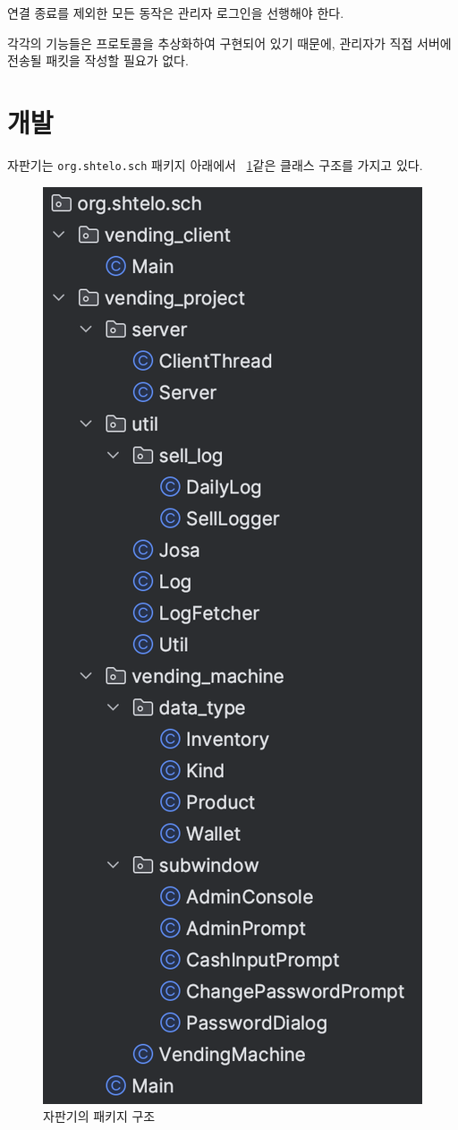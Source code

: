 \documentclass{oblivoir}
\newcommand{\figref}[1]{\figurename~\ref{#1}}
\begin{document}
    연결 종료를 제외한 모든 동작은 관리자 로그인을 선행해야 한다.

    각각의 기능들은 프로토콜을 추상화하여 구현되어 있기 때문에,
    관리자가 직접 서버에 전송될 패킷을 작성할 필요가 없다.

    \section{개발}

    자판기는 \texttt{org.shtelo.sch} 패키지 아래에서 \figref{fig:uml}\과 같은 클래스 구조를 가지고 있다.

    \begin{figure}[h]
        \centering
        \includegraphics[height=0.5\textheight]{images/class-tree}
        \caption{자판기의 패키지 구조}
        \label{fig:uml}
    \end{figure}
\end{document}

